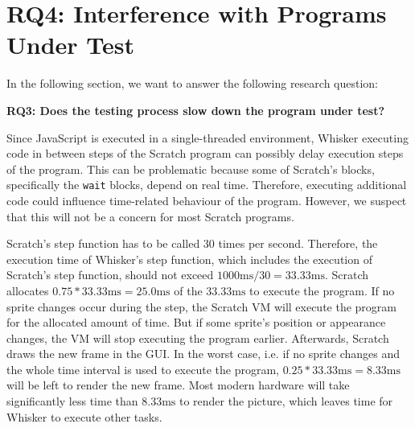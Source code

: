 %
%

\section{RQ4: Interference with Programs Under Test}
\label{sec:rq4}

In the following section, we want to answer the following research question:

\begin{center}\begin{minipage}{.9\textwidth}
    \textbf{RQ3: Does the testing process slow down the program under test?}
\end{minipage}\end{center}

\noindent Since JavaScript is executed in a single-threaded environment,
Whisker executing code in between steps of the Scratch program can possibly delay execution steps of the program.
This can be problematic because some of Scratch's blocks,
specifically the \texttt{wait} blocks, depend on real time.
Therefore, executing additional code could influence time-related behaviour of the program.
However, we suspect that this will not be a concern for most Scratch programs.
\parspace

Scratch's step function has to be called 30 times per second.
Therefore, the execution time of Whisker's step function, which includes the execution of Scratch's step function,
should not exceed $1000\text{ms}/30 = 33.33\text{ms}$.
Scratch allocates $0.75 * 33.33\text{ms} = 25.0\text{ms}$ of the $33.33\text{ms}$ to execute the program.
If no sprite changes occur during the step,
the Scratch VM will execute the program for the allocated amount of time.
But if some sprite's position or appearance changes, the VM will stop executing the program earlier.
Afterwards, Scratch draws the new frame in the GUI.
In the worst case, i.e. if no sprite changes and the whole time interval is used to execute the program,
$0.25 * 33.33\text{ms} = 8.33\text{ms}$ will be left to render the new frame.
Most modern hardware will take significantly less time than $8.33\text{ms}$ to render the picture,
which leaves time for Whisker to execute other tasks.
\parspace

